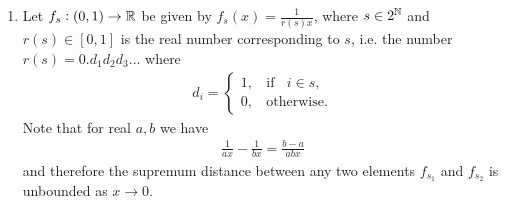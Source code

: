 \begin{enumerate}[label=(2.\arabic*)]
\begin{proof}
    \begin{enumerate}
    \item Set $f$ equal to the function whose graph is a straight line joining $(0, g(0))$ and $(1, g(1))$. In
      other words, set $f$ such that $f(x) = xg(0) + (1-x)g(1)$.
    \item If $d(f, g) < \epsilon$, stop.
    \item Otherwise, divide the interval in half, and repeat the approximation in each half.
    \end{enumerate}
    We need to show that this algorithm terminates.


  \end{proof}

  We must exhibit a sequence of functions that is a dense and countable subset of $\mc C\([0, 1], \R\)$
  under the supremum norm.

  This means that for an arbitrary continuous function $g$, and for any $\epsilon > 0$, we must be able to
  construct a function that lies within $\epsilon$ of $g$.


  \begin{definition}
    A subset $X$ of a metric space is  if for any point $x \in X$, there exists $\epsilon$ such that a ball
    of radius $\epsilon$ centred at $x$ is a subset of $X$.

    A subset $X$ of a metric space is  if it is the complement of an open subset of $X$.

    (Theorem: a set $X^C$ is closed iff it contains all its limit points, i.e. every convergent sequence
    in $X^C$ has its limit in $X^C$.)

    A subset $X$ of a metric space $Y$ is  if every point $y \in Y$ is either in $X$ or arbitrarily close to
    a point in $X$.
  \end{definition}

\item Let $f_s: (0, 1) \to \mathbb{R}$ be given by $f_s(x) = \frac{1}{r(s)x}$, where $s \in 2^{\mathbb{N}}$ and $r(s) \in [0, 1]$ is
  the real number corresponding to $s$, i.e. the number $r(s) = 0.d_1d_2d_3\ldots$ where
  \begin{align*}
    d_i =
    \begin{cases}
      1, ~~~~ \text{if} ~~~~ i \in s,\\
      0, ~~~~ \text{otherwise}.
    \end{cases}
  \end{align*}
  Note that for real $a, b$ we have
  \begin{align*}
    \frac{1}{ax} - \frac{1}{bx} = \frac{b - a}{abx}
  \end{align*}
  and therefore the supremum distance between any two elements $f_{s_1}$ and $f_{s_2}$ is unbounded
  as $x \to 0$.


\end{enumerate}
